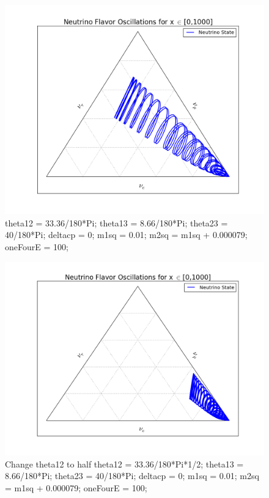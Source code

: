 \documentclass{tufte-handout}
\begin{document}
\begin{figure}
\centering
\includegraphics{assets/ternary/1000-1}
\caption{ 
theta12 = 33.36/180*Pi;\newline
theta13 = 8.66/180*Pi;\newline
theta23 = 40/180*Pi;\newline
deltacp = 0;\newline
m1sq = 0.01;\newline
m2sq = m1sq + 0.000079;\newline
oneFourE = 100; 
}
\end{figure}



\begin{figure}
\centering
\includegraphics{assets/ternary/1000-2}
\caption{ Change theta12 to half \newline
theta12 = 33.36/180*Pi*1/2;\newline
theta13 = 8.66/180*Pi;\newline
theta23 = 40/180*Pi;\newline
deltacp = 0;\newline
m1sq = 0.01;\newline
m2sq = m1sq + 0.000079;\newline
oneFourE = 100; 
}
\end{figure}
\end{document}
